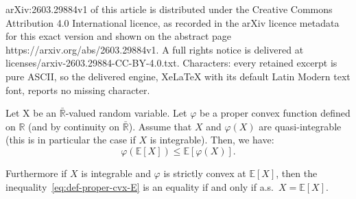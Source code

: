 \documentclass[10pt,a4paper]{amsart}
\newcommand{\E}{{\mathbb E}}
\newcommand{\R}{{\mathbb R}}
\begin{document}
arXiv:2603.29884v1 of this article is distributed under the Creative Commons Attribution 4.0 International licence, as recorded in the arXiv licence metadata for this exact version and shown on the abstract page https://arxiv.org/abs/2603.29884v1. A full rights notice is delivered at licenses/arxiv-2603.29884-CC-BY-4.0.txt. Characters: every retained excerpt is pure ASCII, so the delivered engine, XeLaTeX with its default Latin Modern text font, reports no missing character.
\begin{lem}
\label{lem:equality_jensen}
Let X be an $\bar \R$-valued  random variable. Let $\varphi$ be a proper
convex function defined on $\R$ (and by continuity on $\bar \R$). Assume
that $X$  and $\varphi(X)$ are  quasi-integrable (this is  in particular
the case if $X$ is integrable). Then, we have:
\begin{equation}
  \label{eq:def-proper-cvx-E}
 \varphi(\E[X]) \leq \E[\varphi(X)].
\end{equation}


Furthermore if $X$ is integrable and $\varphi$ is strictly convex at
$\E[X]$, then the inequality~\eqref{eq:def-proper-cvx-E} is an equality
if and only if a.s.\ $X =\E[X]$.
\end{lem}
\end{document}
